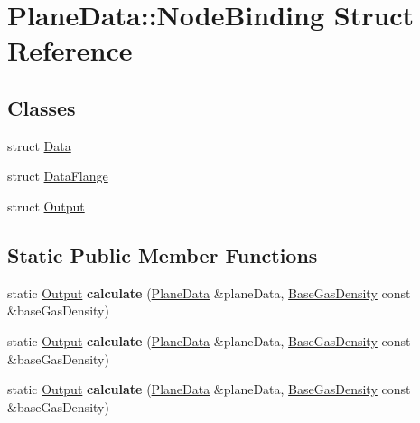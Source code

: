 \hypertarget{struct_plane_data_1_1_node_binding}{}\section{Plane\+Data\+:\+:Node\+Binding Struct Reference}
\label{struct_plane_data_1_1_node_binding}
\subsection*{Classes}
\begin{DoxyCompactItemize}
\item 
struct \hyperlink{struct_plane_data_1_1_node_binding_1_1_data}{Data}
\item 
struct \hyperlink{struct_plane_data_1_1_node_binding_1_1_data_flange}{Data\+Flange}
\item 
struct \hyperlink{struct_plane_data_1_1_node_binding_1_1_output}{Output}
\end{DoxyCompactItemize}
\subsection*{Static Public Member Functions}
\begin{DoxyCompactItemize}
\item 
\mbox{\label{struct_plane_data_1_1_node_binding_a50084489fc0b1ad5048226c2f04e1d49}} 
static \hyperlink{struct_plane_data_1_1_node_binding_1_1_output}{Output} {\bfseries calculate} (\hyperlink{class_plane_data}{Plane\+Data} \&plane\+Data, \hyperlink{class_base_gas_density}{Base\+Gas\+Density} const \&base\+Gas\+Density)
\item 
\mbox{\label{struct_plane_data_1_1_node_binding_a50084489fc0b1ad5048226c2f04e1d49}} 
static \hyperlink{struct_plane_data_1_1_node_binding_1_1_output}{Output} {\bfseries calculate} (\hyperlink{class_plane_data}{Plane\+Data} \&plane\+Data, \hyperlink{class_base_gas_density}{Base\+Gas\+Density} const \&base\+Gas\+Density)
\item 
\mbox{\label{struct_plane_data_1_1_node_binding_a50084489fc0b1ad5048226c2f04e1d49}} 
static \hyperlink{struct_plane_data_1_1_node_binding_1_1_output}{Output} {\bfseries calculate} (\hyperlink{class_plane_data}{Plane\+Data} \&plane\+Data, \hyperlink{class_base_gas_density}{Base\+Gas\+Density} const \&base\+Gas\+Density)
\end{DoxyCompactItemize}


